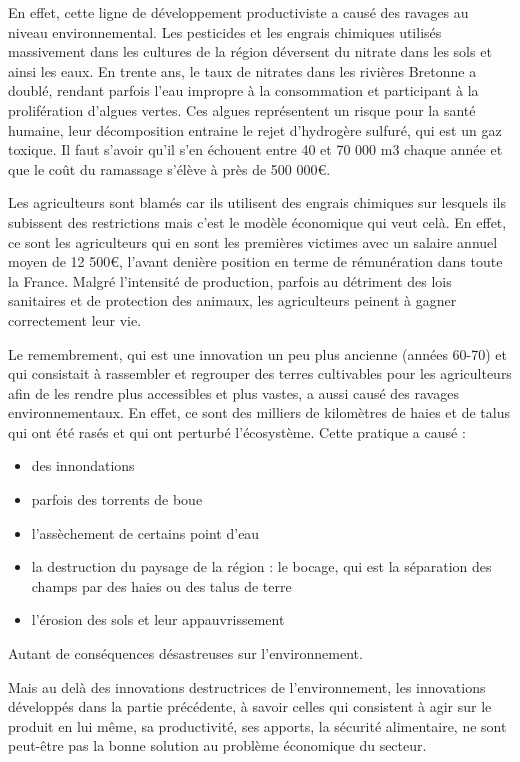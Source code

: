 \documentclass[a4paper,12pt]{report}
\begin{document}
			En effet, cette ligne de développement productiviste a causé des ravages au niveau environnemental. Les pesticides et les engrais chimiques utilisés massivement dans les cultures de la région déversent du nitrate dans les sols et ainsi les eaux. En trente ans, le taux de nitrates dans les rivières Bretonne a doublé, rendant parfois l’eau impropre à la consommation et participant à la prolifération d’algues vertes\cite{NitratesAlguesVertesBretagne}. Ces algues représentent un risque pour la santé humaine, leur décomposition entraine le rejet d’hydrogère sulfuré, qui est un gaz toxique. Il faut s’avoir qu’il s’en échouent entre 40 et 70 000 m3 chaque année et que le coût du ramassage s’élève à près de 500 000\euro.
			
			Les agriculteurs sont blamés car ils utilisent des engrais chimiques sur lesquels ils subissent des restrictions mais c’est le modèle économique qui veut celà. En effet, ce sont les agriculteurs qui en sont les premières victimes avec un salaire annuel moyen de 12 500\euro, l’avant denière position en terme de rémunération dans toute la France\cite{AlguesVertesNouvellePreuveRavagesProductivismeAgricole}. Malgré l’intensité de production, parfois au détriment des lois sanitaires et de protection des animaux, les agriculteurs peinent à gagner correctement leur vie.
			
			
			Le remembrement, qui est une innovation un peu plus ancienne (années 60-70) et qui consistait à rassembler et regrouper des terres cultivables pour les agriculteurs afin de les rendre plus accessibles et plus vastes, a aussi causé des ravages environnementaux. En effet, ce sont des milliers de kilomètres de haies et de talus qui ont été rasés et qui ont perturbé l’écosystème. Cette pratique a causé :
			\begin{itemize}
				\item des innondations
				\item parfois des torrents de boue
				\item l’assèchement de certains point d’eau
				\item la destruction du paysage de la région : le bocage, qui est la séparation des champs par des haies ou des talus de terre
				\item l’érosion des sols et leur appauvrissement
			\end{itemize}
			
			Autant de conséquences désastreuses sur l’environnement.	
			
			Mais au delà des innovations destructrices de l’environnement, les innovations développés dans la partie précédente, à savoir celles qui consistent à agir sur le produit en lui même, sa productivité, ses apports, la sécurité alimentaire, ne sont peut-être pas la bonne solution au problème économique du secteur.
			
\end{document}

